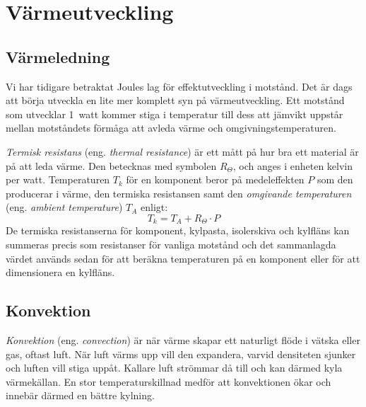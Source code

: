 \section{Värmeutveckling}



\subsection{Värmeledning}



Vi har tidigare betraktat Joules lag för effektutveckling i motstånd.
Det är dags att börja utveckla en lite mer komplett syn på värmeutveckling.
Ett motstånd som utvecklar 1~watt kommer stiga i temperatur till dess att
jämvikt uppstår mellan motståndets förmåga att avleda värme och
omgivningstemperaturen.

\emph{Termisk resistans} (eng. \emph{thermal resistance}) är ett mått på
hur bra ett material är på att leda värme.
Den betecknas med symbolen \(R_\Theta\), och anges i enheten kelvin per watt.
Temperaturen \(T_k\) för en komponent beror på medeleffekten \(P\) som den
producerar i värme, den termiska resistansen samt den
\emph{omgivande temperaturen} (eng. \emph{ambient temperature}) \(T_A\) enligt:
\[T_k = T_A + R_\Theta \cdot P\]
De termiska resistanserna för komponent, kylpasta, isolerskiva och kylfläns
kan summeras precis som resistanser för vanliga motstånd och det
sammanlagda värdet används sedan för att beräkna temperaturen på en
komponent eller för att dimensionera en kylfläns.

\subsection{Konvektion}

\emph{Konvektion} (eng. \emph{convection}) är när värme skapar ett
naturligt flöde i vätska eller gas, oftast luft. När luft värms upp 
vill den expandera, varvid densiteten sjunker och luften vill stiga uppåt.
Kallare luft strömmar då till och kan därmed kyla värmekällan.
En stor temperaturskillnad medför att konvektionen ökar och innebär därmed en
bättre kylning.

